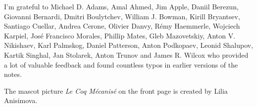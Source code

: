 I'm grateful to Michael D. Adams, Amal Ahmed, Jim Apple, Daniil
Berezun, Giovanni Bernardi, Dmitri Boulytchev, William J. Bowman,
Kirill Bryantsev, Santiago Cuellar, Andrea Cerone, Olivier Danvy,
R\'{e}my Haemmerle, Wojciech Karpiel, Jos\'{e} Francisco Morales, Phillip Mates,
Gleb Mazovetskiy, Anton V. Nikishaev, Karl Palmskog, Daniel Patterson, Anton Podkopaev, 
Leonid Shalupov, Kartik Singhal, Jan Stolarek, Anton Trunov and James R. Wilcox who provided a lot 
of valuable feedback and found countless typos in earlier versions of the notes.


The mascot picture \emph{Le Coq M\'{e}canis\'{e}} on the front page
is created by Lilia Anisimova.


\begin{coqdoccode}
\coqdocemptyline
\end{coqdoccode}
